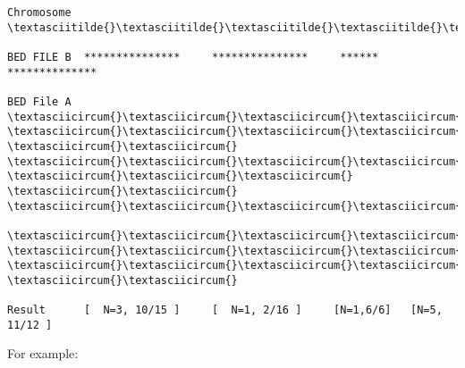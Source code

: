 \documentclass[letterpaper,10pt,english]{sphinxmanual}
\begin{document}
\begin{Verbatim}[commandchars=\\\{\}]
Chromosome  \textasciitilde{}\textasciitilde{}\textasciitilde{}\textasciitilde{}\textasciitilde{}\textasciitilde{}\textasciitilde{}\textasciitilde{}\textasciitilde{}\textasciitilde{}\textasciitilde{}\textasciitilde{}\textasciitilde{}\textasciitilde{}\textasciitilde{}\textasciitilde{}\textasciitilde{}\textasciitilde{}\textasciitilde{}\textasciitilde{}\textasciitilde{}\textasciitilde{}\textasciitilde{}\textasciitilde{}\textasciitilde{}\textasciitilde{}\textasciitilde{}\textasciitilde{}\textasciitilde{}\textasciitilde{}\textasciitilde{}\textasciitilde{}\textasciitilde{}\textasciitilde{}\textasciitilde{}\textasciitilde{}\textasciitilde{}\textasciitilde{}\textasciitilde{}\textasciitilde{}\textasciitilde{}\textasciitilde{}\textasciitilde{}\textasciitilde{}\textasciitilde{}\textasciitilde{}\textasciitilde{}\textasciitilde{}\textasciitilde{}\textasciitilde{}\textasciitilde{}\textasciitilde{}\textasciitilde{}\textasciitilde{}\textasciitilde{}\textasciitilde{}\textasciitilde{}\textasciitilde{}\textasciitilde{}\textasciitilde{}\textasciitilde{}\textasciitilde{}\textasciitilde{}\textasciitilde{}

BED FILE B  ***************     ***************     ******    **************

BED File A  \textasciicircum{}\textasciicircum{}\textasciicircum{}\textasciicircum{} \textasciicircum{}\textasciicircum{}\textasciicircum{}\textasciicircum{}              \textasciicircum{}\textasciicircum{}             \textasciicircum{}\textasciicircum{}\textasciicircum{}\textasciicircum{}\textasciicircum{}\textasciicircum{}\textasciicircum{}\textasciicircum{}\textasciicircum{}    \textasciicircum{}\textasciicircum{}\textasciicircum{} \textasciicircum{}\textasciicircum{} \textasciicircum{}\textasciicircum{}\textasciicircum{}\textasciicircum{}
              \textasciicircum{}\textasciicircum{}\textasciicircum{}\textasciicircum{}\textasciicircum{}\textasciicircum{}\textasciicircum{}\textasciicircum{}                                      \textasciicircum{}\textasciicircum{}\textasciicircum{}\textasciicircum{}\textasciicircum{} \textasciicircum{}\textasciicircum{}\textasciicircum{}\textasciicircum{}\textasciicircum{} \textasciicircum{}\textasciicircum{}

Result      [  N=3, 10/15 ]     [  N=1, 2/16 ]     [N=1,6/6]   [N=5, 11/12 ]
\end{Verbatim}

For example:
\end{document}
